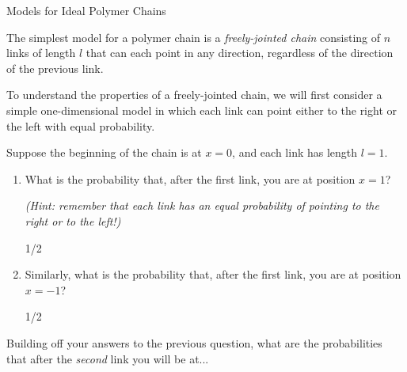 \begin{activity}{Models for Ideal Polymer Chains}
\begin{instructornotes}
\end{instructornotes}


\begin{model}
\label{\labelbase:mdl:randomwalks}

	The simplest model for a polymer chain is a \emph{freely-jointed chain} consisting of $n$ links of length $l$ that can each point in any direction, regardless of the direction of the previous link.
	
	To understand the properties of a freely-jointed chain, we will first consider a simple one-dimensional model in which each link can point either to the right or the left with equal probability.

\end{model}


\begin{ctqs}

	\question Suppose the beginning of the chain is at $x=0$, and each link has length $l=1$.
	
		\begin{enumerate}
			\item What is the probability that, after the first link, you are at position $x=1$?
			
				\emph{(Hint: remember that each link has an equal probability of pointing to the right or to the left!)}
				
				\begin{solution}[0.5in]
				
					1/2
					
				\end{solution}
				
			\item Similarly, what is the probability that, after the first link, you are at position $x=-1$?
				
				\begin{solution}[0.5in]
				
					1/2				
				
				\end{solution}
			
		\end{enumerate}
		
	\question Building off your answers to the previous question, what are the probabilities that after the \emph{second} link you will be at...
	
		\begin{enumerate}
			

\end{enumerate}
\end{ctqs}
\end{activity}

